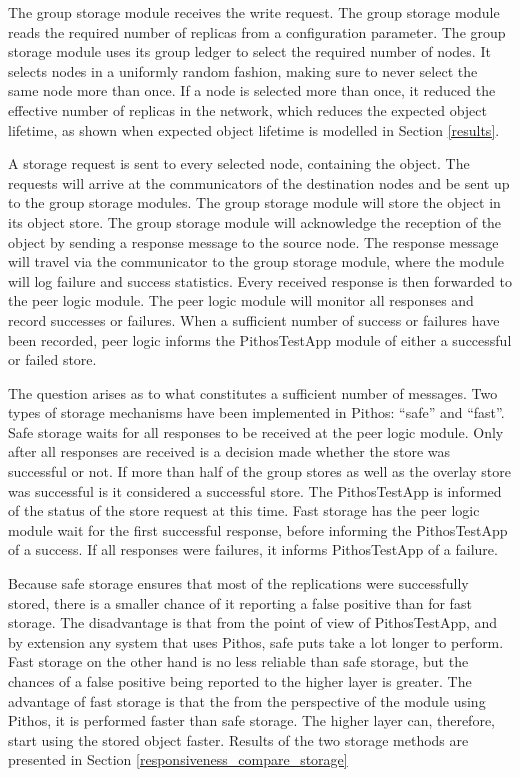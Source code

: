 The group storage module receives the write request. The group storage module reads the required number of replicas from a configuration parameter. The group storage module uses its group ledger to select the required number of nodes. It selects nodes in a uniformly random fashion, making sure to never select the same node more than once. If a node is selected more than once, it reduced the effective number of replicas in the network, which reduces the expected object lifetime, as shown when expected object lifetime is modelled in Section \ref{results}.

A storage request is sent to every selected node, containing the object. The requests will arrive at the communicators of the destination nodes and be sent up to the group storage modules. The group storage module will store the object in its object store. The group storage module will acknowledge the reception of the object by sending a response message to the source node. The response message will travel via the communicator to the group storage module, where the module will log failure and success statistics. Every received response is then forwarded to the peer logic module. The peer logic module will monitor all responses and record successes or failures. When a sufficient number of success or failures have been recorded, peer logic informs the PithosTestApp module of either a successful or failed store.

The question arises as to what constitutes a sufficient number of messages. Two types of storage mechanisms have been implemented in Pithos: ``safe'' and ``fast''. Safe storage waits for all responses to be received at the peer logic module. Only after all responses are received is a decision made whether the store was successful or not. If more than half of the group stores as well as the overlay store was successful is it considered a successful store. The PithosTestApp is informed of the status of the store request at this time. Fast storage has the peer logic module wait for the first successful response, before informing the PithosTestApp of a success. If all responses were failures, it informs PithosTestApp of a failure.

Because safe storage ensures that most of the replications were successfully stored, there is a smaller chance of it reporting a false positive than for fast storage. The disadvantage is that from the point of view of PithosTestApp, and by extension any system that uses Pithos, safe puts take a lot longer to perform. Fast storage on the other hand is no less reliable than safe storage, but the chances of a false positive being reported to the higher layer is greater. The advantage of fast storage is that the from the perspective of the module using Pithos, it is performed faster than safe storage. The higher layer can, therefore, start using the stored object faster. Results of the two storage methods are presented in Section \ref{responsiveness_compare_storage}


